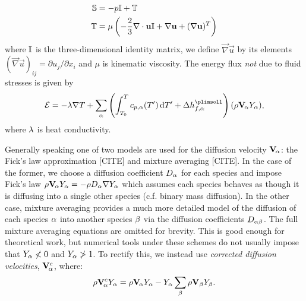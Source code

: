 \begin{subequations}
\begin{align}
\mathbb{S} &= -p\mathbb{I} + \mathbb{T} \\
\mathbb{T} &= \mu \left( - \frac{2}{3}\mathbf{\nabla}\cdot\mathbf{u} \mathbb{I} + \mathbf{\nabla}\mathbf{u} + (\mathbf{\nabla}\mathbf{u})^T \right)
\end{align}
\end{subequations}
where $\mathbb{I}$ is the three-dimensional identity matrix, we define $\vec{\nabla}\vec{u}$ by its elements $(\vec{\nabla}\vec{u})_{ij} = \partial u_j / \partial x_i$ and $\mu$ is kinematic viscosity. The energy flux \emph{not} due to fluid stresses is given by
\begin{align}
\vec{\cl{E}} = -\l \vec{\nabla} T + \sum_\a \left( \int_{T_0}^T c_{p, \a}(T') \dd{T'} + \D h_{f, \a}^\plimsoll \right) (\r \vec{V}_{\!\a} Y_\a),
\end{align}
where $\lambda$ is heat conductivity.

Generally speaking one of two models are used for the diffusion velocity $\mathbf{V}_{\!\alpha}$: the Fick's law approximation [CITE] and mixture averaging [CITE]. In the case of the former, we choose a diffusion coefficient $D_\alpha$ for each species and impose Fick's law $\rho \mathbf{V}_{\!\alpha} Y_\alpha = - \rho D_\alpha \mathbf{\nabla} Y_\alpha$ which assumes each species behaves as though it is diffusing into a single other species (c.f. binary mass diffusion). In the other case, mixture averaging provides a much more detailed model of the diffusion of each species $\alpha$ into another species $\beta$ via the diffusion coefficients $D_{\alpha\beta}$. The full mixture averaging equations are omitted for brevity. This is good enough for theoretical work, but numerical tools under these schemes do not usually impose that $Y_\alpha \nless 0$ and $Y_\alpha \ngtr 1$. To rectify this, we instead use \emph{corrected diffusion velocities}, $\mathbf{V}_{\!\alpha}^c$, where:
\begin{equation}
\rho \mathbf{V}_{\!\alpha}^c Y_\alpha = \rho \mathbf{V}_{\!\alpha} Y_\alpha - Y_\alpha \sum_{\beta} \rho \mathbf{V}_\beta Y_\beta.
\end{equation}

